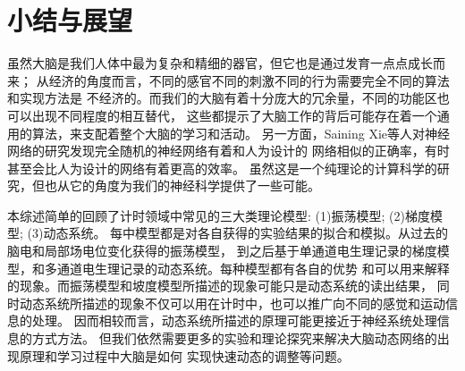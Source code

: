 \section{小结与展望}

虽然大脑是我们人体中最为复杂和精细的器官，但它也是通过发育一点点成长而来；
从经济的角度而言，不同的感官不同的刺激不同的行为需要完全不同的算法和实现方法是
不经济的。而我们的大脑有着十分庞大的冗余量，不同的功能区也可以出现不同程度的相互替代，
这些都提示了大脑工作的背后可能存在着一个通用的算法，来支配着整个大脑的学习和活动。
另一方面，Saining Xie等人对神经网络的研究发现完全随机的神经网络有着和人为设计的
网络相似的正确率，有时甚至会比人为设计的网络有着更高的效率\cite{xie2019exploring}。
虽然这是一个纯理论的计算科学的研究，但也从它的角度为我们的神经科学提供了一些可能。

本综述简单的回顾了计时领域中常见的三大类理论模型: (1)振荡模型; (2)梯度模型; (3)动态系统。
每中模型都是对各自获得的实验结果的拟合和模拟。从过去的脑电和局部场电位变化获得的振荡模型，
到之后基于单通道电生理记录的梯度模型，和多通道电生理记录的动态系统。每种模型都有各自的优势
和可以用来解释的现象。而振荡模型和坡度模型所描述的现象可能只是动态系统的读出结果，
同时动态系统所描述的现象不仅可以用在计时中，也可以推广向不同的感觉和运动信息的处理。
因而相较而言，动态系统所描述的原理可能更接近于神经系统处理信息的方式方法。
但我们依然需要更多的实验和理论探究来解决大脑动态网络的出现原理和学习过程中大脑是如何
实现快速动态的调整等问题。

